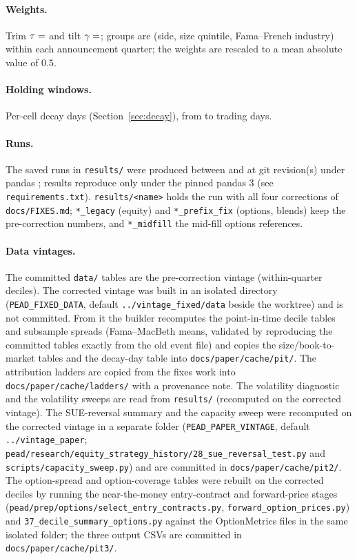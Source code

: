\documentclass[11pt]{article}
\theoremstyle{definition}
\newcommand{\1}{\mathbf{1}}
\begin{document}
\paragraph{Weights.} Trim $\tau=\stv{balanced_leverage.trim}$ and tilt $\gamma=\stv{balanced_leverage.tilt}$; groups are (side, size quintile, Fama--French industry) within each announcement quarter; the weights are rescaled to a mean absolute value of $0.5$.
\paragraph{Holding windows.} Per-cell decay days (Section~\ref{sec:decay}), from  to  trading days.
\paragraph{Runs.} The  saved runs in \texttt{results/} were produced between  and  at git revision(s)  under pandas ; results reproduce only under the pinned pandas 3 (see \texttt{requirements.txt}). \texttt{results/<name>} holds the run with all four corrections of \texttt{docs/FIXES.md}; \texttt{*\_legacy} (equity) and \texttt{*\_prefix\_fix} (options, blends) keep the pre-correction numbers, and \texttt{*\_midfill} the mid-fill options references.

\paragraph{Data vintages.} The committed \texttt{data/} tables are the pre-correction vintage (within-quarter deciles). The corrected vintage was built in an isolated directory (\texttt{PEAD\_FIXED\_DATA}, default \texttt{../vintage\_fixed/data} beside the worktree) and is not committed. From it the builder recomputes the point-in-time decile tables and subsample spreads (Fama--MacBeth means, validated by reproducing the committed tables exactly from the old event file) and copies the size/book-to-market tables and the decay-day table into \texttt{docs/paper/cache/pit/}. The attribution ladders are copied from the fixes work into \texttt{docs/paper/cache/ladders/} with a provenance note. The volatility diagnostic and the volatility sweeps are read from \texttt{results/} (recomputed on the corrected vintage). The SUE-reversal summary and the capacity sweep were recomputed on the corrected vintage in a separate folder (\texttt{PEAD\_PAPER\_VINTAGE}, default \texttt{../vintage\_paper}; \texttt{pead/research/equity\_strategy\_history/28\_sue\_reversal\_test.py} and \texttt{scripts/capacity\_sweep.py}) and are committed in \texttt{docs/paper/cache/pit2/}. The option-spread and option-coverage tables were rebuilt on the corrected deciles by running the near-the-money entry-contract and forward-price stages (\texttt{pead/prep/options/select\_entry\_contracts.py}, \texttt{forward\_option\_prices.py}) and \texttt{37\_decile\_summary\_options.py} against the OptionMetrics files in the same isolated folder; the three output CSVs are committed in \texttt{docs/paper/cache/pit3/}.
\end{document}
